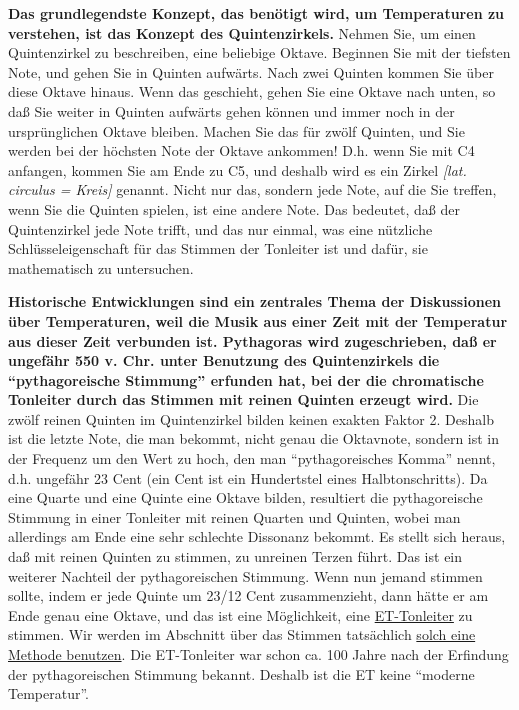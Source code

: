 \textbf{Das grundlegendste Konzept, das benötigt wird, um Temperaturen zu verstehen, ist das Konzept des Quintenzirkels.}
 Nehmen Sie, um einen Quintenzirkel zu beschreiben, eine beliebige Oktave.
 Beginnen Sie mit der tiefsten Note, und gehen Sie in Quinten aufwärts.
 Nach zwei Quinten kommen Sie über diese Oktave hinaus.
 Wenn das geschieht, gehen Sie eine Oktave nach unten, so daß Sie weiter in Quinten aufwärts gehen können und immer noch in der ursprünglichen Oktave bleiben.
 Machen Sie das für zwölf Quinten, und Sie werden bei der höchsten Note der Oktave ankommen!
 D.h. wenn Sie mit C4 anfangen, kommen Sie am Ende zu C5, und deshalb wird es ein Zirkel \textit{[lat. circulus = Kreis]} genannt.
 Nicht nur das, sondern jede Note, auf die Sie treffen, wenn Sie die Quinten spielen, ist eine andere Note.
 Das bedeutet, daß der Quintenzirkel jede Note trifft, und das nur einmal, was eine nützliche Schlüsseleigenschaft für das Stimmen der Tonleiter ist und dafür, sie mathematisch zu untersuchen.
 \hypertarget{c2_2_hist}{}

\textbf{Historische Entwicklungen sind ein zentrales Thema der Diskussionen über Temperaturen, weil die Musik aus einer Zeit mit der Temperatur aus dieser Zeit verbunden ist.
 Pythagoras wird zugeschrieben, daß er ungefähr 550 v. Chr. unter Benutzung des Quintenzirkels die \enquote{pythagoreische Stimmung} erfunden hat, bei der die chromatische Tonleiter durch das Stimmen mit reinen Quinten erzeugt wird.}
 Die zwölf reinen Quinten im Quintenzirkel bilden keinen exakten Faktor 2.
 Deshalb ist die letzte Note, die man bekommt, nicht genau die Oktavnote, sondern ist in der Frequenz um den Wert zu hoch, den man \enquote{pythagoreisches Komma} nennt, d.h. ungefähr 23 Cent (ein Cent ist ein Hundertstel eines Halbtonschritts).
 Da eine Quarte und eine Quinte eine Oktave bilden, resultiert die pythagoreische Stimmung in einer Tonleiter mit reinen Quarten und Quinten, wobei man allerdings am Ende eine sehr schlechte Dissonanz bekommt.
 Es stellt sich heraus, daß mit reinen Quinten zu stimmen, zu unreinen Terzen führt.
 Das ist ein weiterer Nachteil der pythagoreischen Stimmung.
 Wenn nun jemand stimmen sollte, indem er jede Quinte um 23/12 Cent zusammenzieht, dann hätte er am Ende genau eine Oktave, und das ist eine Möglichkeit, eine \hyperlink{et1}{ET-Tonleiter} zu stimmen.
 Wir werden im Abschnitt über das Stimmen tatsächlich \hyperlink{c2_6_et}{solch eine Methode benutzen}.
 Die ET-Tonleiter war schon ca. 100 Jahre nach der Erfindung der pythagoreischen Stimmung bekannt.
 Deshalb ist die ET keine \enquote{moderne Temperatur}.
 

